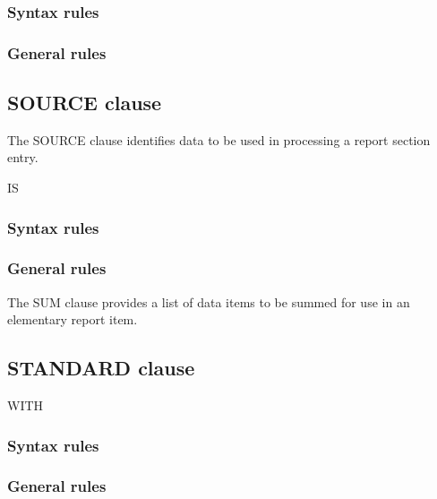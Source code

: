 \begin{syntax}[\miscextcolour]
\end{syntax}

\subsubsection{Syntax rules}

\subsubsection{General rules}

\subsection{SOURCE clause}

The SOURCE clause identifies data to be used in processing a report section entry.

\begin{syntax}
   IS 
  \begin{0-1}
  \end{0-1}
\end{syntax}

\subsubsection{Syntax rules}

\subsubsection{General rules}

The SUM clause provides a list of data items to be summed for use in an elementary report item.

\subsection{STANDARD clause}

\begin{syntax}[\miscextcolour]
  WITH 
\end{syntax}

\subsubsection{Syntax rules}

\subsubsection{General rules}

